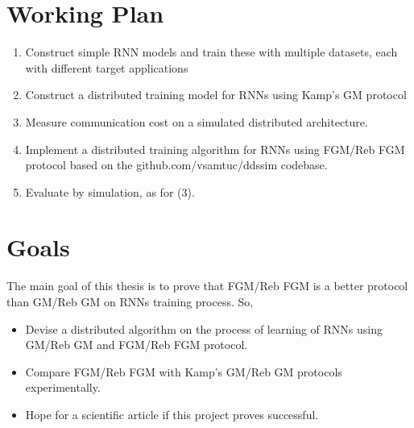 \documentclass{article}
\begin{document}
    \section*{Working Plan}
    \begin{enumerate}[label=\arabic*)]
        \item Construct simple RNN models and train these with multiple datasets, each with different target applications
        \item Construct a distributed training model for RNNs using Kamp's GM protocol
        \item Measure communication cost on a simulated distributed architecture.
        \item Implement a distributed training algorithm for RNNs using FGM/Reb FGM protocol based on the github.com/vsamtuc/ddssim codebase.
        \item Evaluate by simulation, as for (3).
    \end{enumerate}

    \section*{Goals}
    The main goal of this thesis is to prove that FGM/Reb FGM is a better protocol than GM/Reb GM on RNNs training process.
    So, \\
    \begin{itemize}
        \item Devise a distributed algorithm on the process of learning of RNNs using GM/Reb GM and FGM/Reb FGM protocol.
        \item Compare FGM/Reb FGM with Kamp's GM/Reb GM protocols experimentally.
        \item Hope for a scientific article if this project proves successful.
    \end{itemize}

    \newpage
\end{document}
